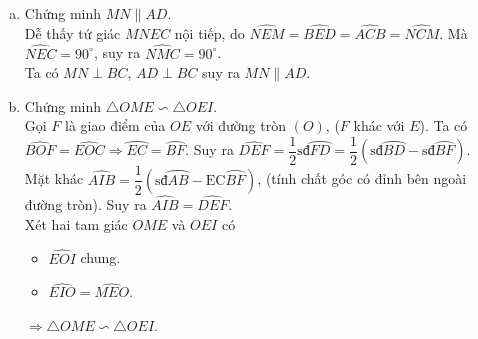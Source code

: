 \begin{ex}
{ 
\begin{enumerate}[a)]
	\item Chứng minh $MN\parallel AD$.\\
	Dễ thấy tứ giác $MNEC $ nội tiếp, do $\widehat{NEM}=\widehat{BED}=\widehat{ACB}=\widehat{NCM}$. Mà $\widehat{NEC}=90^\circ$, suy ra $\widehat{NMC}=90^\circ$.\\
	Ta có $ MN\perp BC$, $AD \perp BC$ suy ra $ MN \parallel AD$.
	\item Chứng minh $\triangle OME \backsim \triangle OEI$.\\
	Gọi $F$ là giao điểm của $OE$ với đường tròn $ (O) $, ($F$ khác với $E$).
	Ta có $\widehat{BOF}=\widehat{EOC}\Rightarrow \wideparen{EC}=\wideparen{BF}$.
	Suy ra $ \widehat{DEF}=\dfrac{1}{2}\text{sđ}\wideparen{FD}=\dfrac{1}{2}\left(\text{sđ}\wideparen{BD}-\text{sđ}\wideparen{BF}\right)$.\\
	Mặt khác $\widehat{AIB}=\dfrac{1}{2}\left(\text{sđ}\wideparen{AB}-\text{EC}\wideparen{BF}\right)$, (tính chất góc có đỉnh bên ngoài đường tròn). Suy ra $\widehat{AIB}=\widehat{DEF}$.\\
	Xét hai tam giác $OME$ và $OEI$ có
	\begin{itemize}
		\item 	$\widehat{EOI}$ chung.
		\item $\widehat{EIO}=\widehat{MEO}$.
	\end{itemize}
	$\Rightarrow \triangle OME \backsim \triangle OEI$.
\end{enumerate}

    }
\end{ex}

